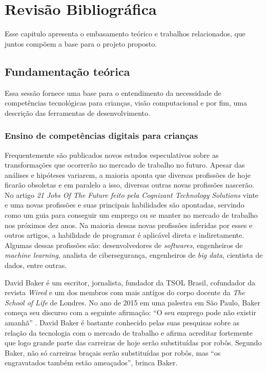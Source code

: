 \chapter{Revisão Bibliográfica} \label{cap:rev}
Esse capitulo apresenta o embasamento teórico e trabalhos relacionados, que juntos compõem a base para o projeto proposto.

\section{Fundamentação teórica}
Essa sessão fornece uma base para o entendimento da necessidade de competências tecnológicas para crianças, visão computacional e por fim, uma descrição das ferramentas de desenvolvimento.

\subsection{Ensino de competências digitais para crianças}

Frequentemente são publicados novos estudos especulativos sobre as transformações que ocorrerão no mercado de trabalho no futuro. Apesar das análises e hipóteses variarem, a maioria aponta que diversas profissões de hoje ficarão obsoletas e em paralelo a isso, diversas outras novas profissões nascerão. No artigo \textit{21 Jobs Of The Future feito pela Cognizant Technology Solutions} \cite{cognizant_2017} vinte e uma novas profissões e suas principais habilidades são apontadas, servindo como um guia para conseguir um emprego ou se manter no mercado de trabalho nos próximos dez anos. Na maioria dessas novas profissões inferidas por esses e outros artigos, a habilidade de programar é aplicável direta e indiretamente. Algumas dessas profissões são: desenvolvedores de \textit{softwares}, engenheiros de \textit{machine learning}, analista de cibersegurança, engenheiros de \textit{big data}, cientista de dados, entre outras.

David Baker é um escritor, jornalista, fundador da TSOL Brasil, cofundador da revista \textit{Wired} e um dos membros com mais antigos do corpo docente da \textit{The School of Life} de Londres. No ano de 2015 em uma palestra em São Paulo, Baker começa seu discurso com a seguinte afirmação: “O seu emprego pode não existir amanhã” \cite{carvalho_2015}. David Baker é bastante conhecido pelas suas pesquisas sobre as relação da tecnologia com o mercado de trabalho e afirma acreditar fortemente que logo grande parte das carreiras de hoje serão substituídas por robôs. Segundo Baker, não só carreiras braçais serão substituídas por robôs, mas “os engravatados também estão ameaçados”, brinca Baker.

